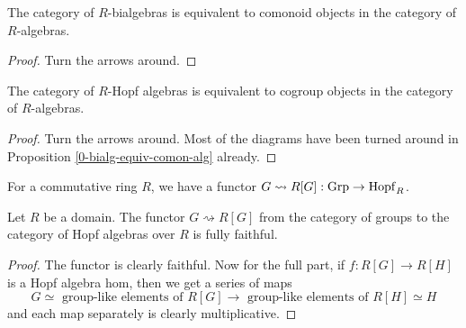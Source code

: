 \begin{proposition}
  \label{0-bialg-equiv-comon-alg}
  \uses{}
  \leanok

  The category of $R$-bialgebras is equivalent to comonoid objects in the category of $R$-algebras.
\end{proposition}
\begin{proof}
  \uses{}
  \leanok

  Turn the arrows around.
\end{proof}


\begin{proposition}
  \label{0-hopf-alg-equiv-cogrp-alg}
  \uses{}
  \leanok

  The category of $R$-Hopf algebras is equivalent to cogroup objects in the category of $R$-algebras.
\end{proposition}
\begin{proof}
  \leanok

  Turn the arrows around.
  Most of the diagrams have been turned around in Proposition \ref{0-bialg-equiv-comon-alg} already.
\end{proof}


\begin{definition}
  \label{0-grp-alg}
  \uses{}
  \leanok

  For a commutative ring $R$, we have a functor $G \rightsquigarrow R[G] : \operatorname{Grp} \to \operatorname{Hopf}_R$.
\end{definition}


\begin{proposition}
  \label{0-full-faithful-grp-alg}
  \leanok

  Let $R$ be a domain.
  The functor $G \rightsquigarrow R[G]$ from the category of groups to the category of Hopf algebras over $R$ is fully faithful.
\end{proposition}
\begin{proof}
  \leanok

  The functor is clearly faithful.
  Now for the full part, if $f : R[G] \to R[H]$ is a Hopf algebra hom, then we get a series of maps
  \[
    G \simeq \text{ group-like elements of } R[G] \to \text{ group-like elements of } R[H] \simeq H
  \]
  and each map separately is clearly multiplicative.
\end{proof}
